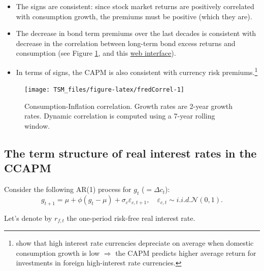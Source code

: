\documentclass[
  12pt,
]{book}
\providecommand{\tightlist}{%
  \setlength{\itemsep}{0pt}\setlength{\parskip}{0pt}}
\theoremstyle{definition}
\theoremstyle{definition}
\theoremstyle{definition}
\theoremstyle{definition}
\theoremstyle{remark}
\begin{document}
\begin{itemize}
\tightlist
\item
  The signs are consistent: since stock market returns are positively correlated with consumption growth, the premiums must be positive (which they are).
\item
  The decrease in bond term premiums over the last decades is consistent with decrease in the correlation between long-term bond excess returns and consumption (see Figure \ref{fig:fredCorrel}, and this \href{https://jrenne.shinyapps.io/APModels}{web interface}).
\item
  In terms of signs, the CAPM is also consistent with currency risk premiums.\footnote{\citet{Lustig_Verdelhan_2007} show that high interest rate currencies depreciate on average when domestic consumption growth is low \(\Rightarrow\) the CAPM predicts higher average return for investments in foreign high-interest rate currencies.}
\end{itemize}

\begin{figure}
\texttt{[image: TSM\_files/figure-latex/fredCorrel-1]} \caption{Consumption-Inflation correlation. Growth rates are 2-year growth rates. Dynamic correlation is computed using a 7-year rolling window.}\label{fig:fredCorrel}
\end{figure}

\hypertarget{the-term-structure-of-real-interest-rates-in-the-ccapm}{%
\subsection{The term structure of real interest rates in the CCAPM}\label{the-term-structure-of-real-interest-rates-in-the-ccapm}}

Consider the following AR(1) process for \(g_t\) (\(=\Delta c_{t}\)):
\[
g_{t+1} = \mu + \phi (g_t - \mu) + \sigma_c \varepsilon_{c,t+1},\quad \varepsilon_{c,t} \sim i.i.d.\mathcal{N}(0,1).
\]

Let's denote by \(r_{f,t}\) the one-period risk-free real interest rate.
\end{document}
